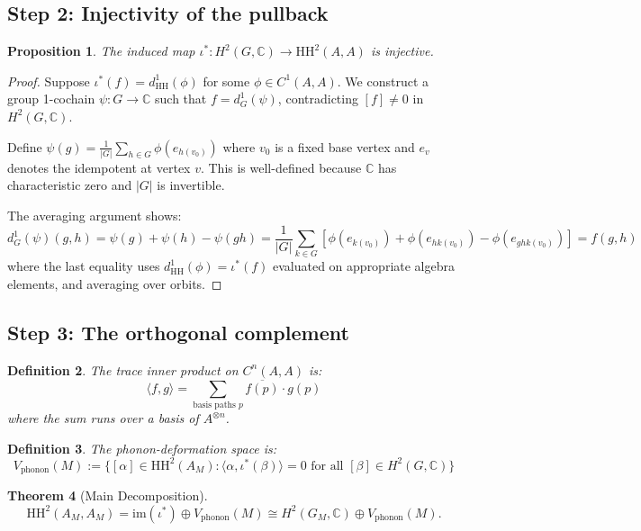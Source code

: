 \documentclass[12pt,a4paper]{article}
\newtheorem{theorem}{Theorem}[section]
\newtheorem{proposition}[theorem]{Proposition}
\newtheorem{definition}[theorem]{Definition}
\newcommand{\HH}{\mathrm{HH}}
\newcommand{\CC}{\mathbb{C}}
\newcommand{\im}{\mathrm{im}}
\begin{document}
\subsection{Step 2: Injectivity of the pullback}

\begin{proposition}
\label{prop:pullback-injective}
The induced map $\iota^*: H^2(G, \CC) \to \HH^2(A, A)$ is injective.
\end{proposition}

\begin{proof}
Suppose $\iota^*(f) = d^1_{\HH}(\phi)$ for some $\phi \in C^1(A, A)$.
We construct a group 1-cochain $\psi: G \to \CC$ such that
$f = d^1_G(\psi)$, contradicting $[f] \neq 0$ in $H^2(G, \CC)$.

Define $\psi(g) = \frac{1}{|G|} \sum_{h \in G} \phi(e_{h(v_0)})$
where $v_0$ is a fixed base vertex and $e_v$ denotes the idempotent
at vertex $v$. This is well-defined because $\CC$ has characteristic
zero and $|G|$ is invertible.

The averaging argument shows:
\[
d^1_G(\psi)(g, h) = \psi(g) + \psi(h) - \psi(gh)
= \frac{1}{|G|} \sum_{k \in G}
[\phi(e_{k(v_0)}) + \phi(e_{hk(v_0)}) - \phi(e_{ghk(v_0)})]
= f(g, h)
\]
where the last equality uses $d^1_{\HH}(\phi) = \iota^*(f)$ evaluated
on appropriate algebra elements, and averaging over orbits.
\end{proof}

\subsection{Step 3: The orthogonal complement}

\begin{definition}
The \emph{trace inner product} on $C^n(A, A)$ is:
\[
\langle f, g \rangle = \sum_{\text{basis paths } p}
\overline{f(p)} \cdot g(p)
\]
where the sum runs over a basis of $A^{\otimes n}$.
\end{definition}

\begin{definition}
The \emph{phonon-deformation space} is:
\[
V_{\mathrm{phonon}}(M) := \{ [\alpha] \in \HH^2(A_M) :
\langle \alpha, \iota^*(\beta) \rangle = 0
\text{ for all } [\beta] \in H^2(G, \CC) \}
\]
\end{definition}

\begin{theorem}[Main Decomposition]
\[
\HH^2(A_M, A_M) = \im(\iota^*) \oplus V_{\mathrm{phonon}}(M)
\cong H^2(G_M, \CC) \oplus V_{\mathrm{phonon}}(M).
\]
\end{theorem}
\end{document}
